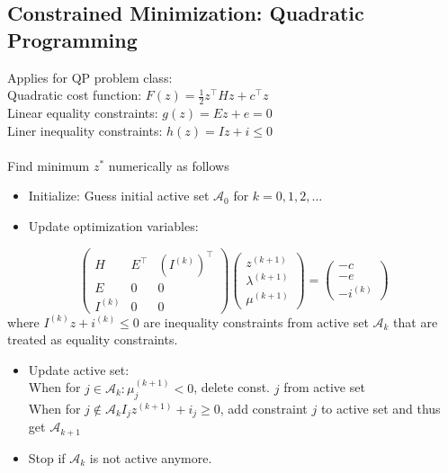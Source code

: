 \documentclass[english]{latex4ei/latex4ei_sheet}
\begin{document}
\begin{sectionbox}

\subsection{Constrained Minimization: Quadratic Programming}
Applies for QP problem class:\\
Quadratic cost function: $F(z)=\frac{1}{2}z^{\top}Hz+c^{\top}z$\\
Linear equality constraints: $g(z)=Ez+e=0$\\
Liner inequality constraints: $h(z)=Iz+i\leq 0$\\
\\
Find minimum $z^{*}$ numerically as follows
\begin{itemize}
    \item Initialize: Guess initial active set $\mathcal{A}_0$ for $k=0,1,2,\ldots$
    \item Update optimization variables:
\end{itemize}
$$\left(\begin{array}{ccc}{H} & {E^{\top}} & {\left(I^{(k)}\right)^{\top}} \\ {E} & {0} & {0} \\ {I^{(k)}} & {0} & {0}\end{array}\right)\left(\begin{array}{l}{z^{(k+1)}} \\ {\lambda^{(k+1)}} \\ {\mu^{(k+1)}}\end{array}\right)=\left(\begin{array}{c}{-c} \\ {-e} \\ {-i^{(k)}}\end{array}\right)$$
where $I^{(k)}z+i^{(k)}\leq 0$ are inequality constraints from active set $\mathcal{A}_k$ that are treated as equality constraints.
\begin{itemize}
    \item Update active set:\\
    When for $j \in \mathcal{A}_{k}: \mu_{j}^{(k+1)}<0$, delete const. $j$ from active set\\
    When for $j \notin \mathcal{A}_{k} I_{j} z^{(k+1)}+i_{j} \geq 0$, add constraint $j$ to active set and thus get $\mathcal{A}_{k+1}$
    \item Stop if $\mathcal{A}_{k}$ is not active anymore.
\end{itemize}\vspace{0.2cm}


\end{sectionbox}
\end{document}

